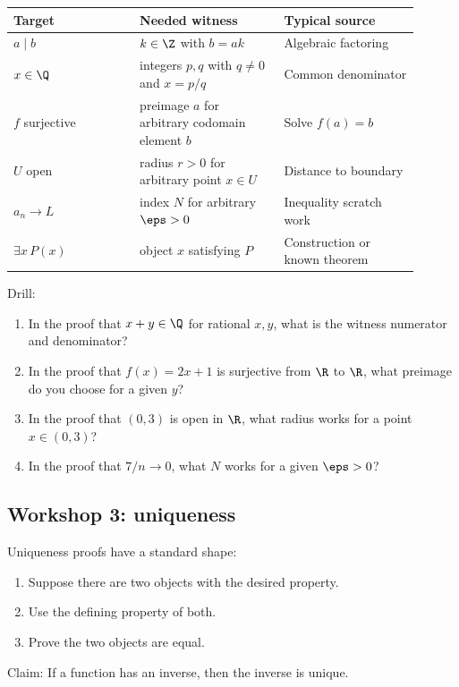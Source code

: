 \begin{longtable}{p{0.28\linewidth}p{0.32\linewidth}p{0.3\linewidth}}
\toprule
Target & Needed witness & Typical source \\
\midrule
$a\mid b$ & $k\in\Z$ with $b=ak$ & Algebraic factoring \\
$x\in\Q$ & integers $p,q$ with $q\neq0$ and $x=p/q$ & Common denominator \\
$f$ surjective & preimage $a$ for arbitrary codomain element $b$ & Solve $f(a)=b$ \\
$U$ open & radius $r>0$ for arbitrary point $x\in U$ & Distance to boundary \\
$a_n\to L$ & index $N$ for arbitrary $\eps>0$ & Inequality scratch work \\
$\exists x\,P(x)$ & object $x$ satisfying $P$ & Construction or known theorem \\
\bottomrule
\end{longtable}

Drill:

\begin{enumerate}
\item In the proof that $x+y\in\Q$ for rational $x,y$, what is the witness numerator and denominator?
\item In the proof that $f(x)=2x+1$ is surjective from $\R$ to $\R$, what preimage do you choose for a given $y$?
\item In the proof that $(0,3)$ is open in $\R$, what radius works for a point $x\in(0,3)$?
\item In the proof that $7/n\to0$, what $N$ works for a given $\eps>0$?
\end{enumerate}

\subsection{Workshop 3: uniqueness}

Uniqueness proofs have a standard shape:

\begin{enumerate}
\item Suppose there are two objects with the desired property.
\item Use the defining property of both.
\item Prove the two objects are equal.
\end{enumerate}

Claim: If a function has an inverse, then the inverse is unique.


